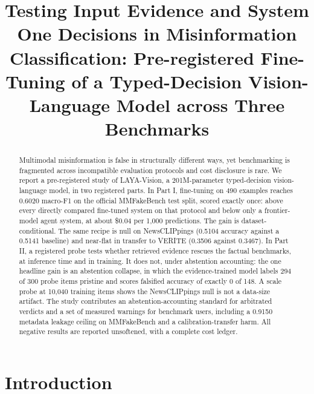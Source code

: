 \documentclass[conference]{IEEEtran}
\begin{document}
\title{Testing Input Evidence and System One Decisions in Misinformation Classification: Pre-registered Fine-Tuning of a Typed-Decision Vision-Language Model across Three Benchmarks}

\author{
}

\maketitle

\begin{abstract}
Multimodal misinformation is false in structurally different ways, yet benchmarking is fragmented across incompatible evaluation protocols and cost disclosure is rare. We report a pre-registered study of LAYA-Vision, a 201M-parameter typed-decision vision-language model, in two registered parts. In Part I, fine-tuning on 490 examples reaches 0.6020 macro-F1 on the official MMFakeBench test split, scored exactly once: above every directly compared fine-tuned system on that protocol and below only a frontier-model agent system, at about \$0.04 per 1,000 predictions. The gain is dataset-conditional. The same recipe is null on NewsCLIPpings (0.5104 accuracy against a 0.5141 baseline) and near-flat in transfer to VERITE (0.3506 against 0.3467). In Part II, a registered probe tests whether retrieved evidence rescues the factual benchmarks, at inference time and in training. It does not, under abstention accounting: the one headline gain is an abstention collapse, in which the evidence-trained model labels 294 of 300 probe items pristine and scores falsified accuracy of exactly 0 of 148. A scale probe at 10,040 training items shows the NewsCLIPpings null is not a data-size artifact. The study contributes an abstention-accounting standard for arbitrated verdicts and a set of measured warnings for benchmark users, including a 0.9150 metadata leakage ceiling on MMFakeBench and a calibration-transfer harm. All negative results are reported unsoftened, with a complete cost ledger.
\end{abstract}

\section{Introduction}
\end{document}
